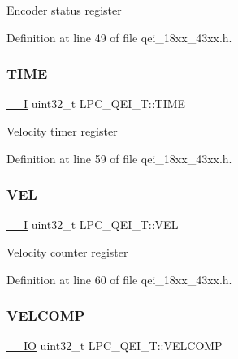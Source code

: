 Encoder status register 

Definition at line 49 of file qei\+\_\+18xx\+\_\+43xx.\+h.

\mbox{\label{struct_l_p_c___q_e_i___t_a73a528b77fc560d229dc287237a9879e}} 
\subsubsection{\texorpdfstring{T\+I\+ME}{TIME}}
{\footnotesize\ttfamily \hyperlink{core__sc300_8h_af63697ed9952cc71e1225efe205f6cd3}{\+\_\+\+\_\+I} uint32\+\_\+t L\+P\+C\+\_\+\+Q\+E\+I\+\_\+\+T\+::\+T\+I\+ME}

Velocity timer register 

Definition at line 59 of file qei\+\_\+18xx\+\_\+43xx.\+h.

\mbox{\label{struct_l_p_c___q_e_i___t_a15e45a6723e72a83eb3c2671b1c1f43d}} 
\subsubsection{\texorpdfstring{V\+EL}{VEL}}
{\footnotesize\ttfamily \hyperlink{core__sc300_8h_af63697ed9952cc71e1225efe205f6cd3}{\+\_\+\+\_\+I} uint32\+\_\+t L\+P\+C\+\_\+\+Q\+E\+I\+\_\+\+T\+::\+V\+EL}

Velocity counter register 

Definition at line 60 of file qei\+\_\+18xx\+\_\+43xx.\+h.

\mbox{\label{struct_l_p_c___q_e_i___t_a5237f6f2f6ed6530bbf6a13d0e20151f}} 
\subsubsection{\texorpdfstring{V\+E\+L\+C\+O\+MP}{VELCOMP}}
{\footnotesize\ttfamily \hyperlink{core__sc300_8h_aec43007d9998a0a0e01faede4133d6be}{\+\_\+\+\_\+\+IO} uint32\+\_\+t L\+P\+C\+\_\+\+Q\+E\+I\+\_\+\+T\+::\+V\+E\+L\+C\+O\+MP}

